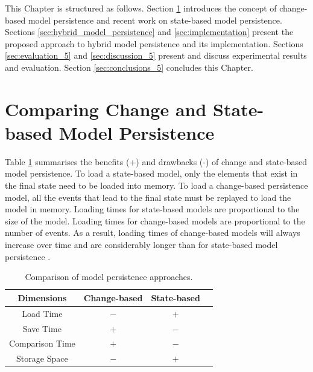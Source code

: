 This Chapter is structured as follows. Section \ref{sec:change_and_state_based_model_persistence} introduces the concept of change-based model persistence and recent work on state-based model persistence. Sections \ref{sec:hybrid_model_persistence} and \ref{sec:implementation} present the proposed approach to hybrid model persistence and its implementation. Sections \ref{sec:evaluation_5} and \ref{sec:discussion_5} present and discuss experimental results and evaluation. Section \ref{sec:conclusions_5} concludes this Chapter.

\section{Comparing Change and State-based Model Persistence}
\label{sec:change_and_state_based_model_persistence}
Table \ref{table:persistence_comparsion} summarises the benefits (+) and drawbacks (-) of change and state-based model persistence. To load a state-based model, only the elements that exist in the final state need to be loaded into memory. To load a change-based persistence model, all the events that lead to the final state must be replayed to load the model in memory. Loading times for state-based models are proportional to the size of the model. Loading times for change-based models are proportional to the number of events. As a result, loading times of change-based models will always increase over time and are considerably longer than for state-based model persistence \cite{yohannis2018towards,mens2002state}. 

\begin{table}[ht]
  \caption{Comparison of model persistence approaches.}
  \label{table:persistence_comparsion}
  \centering
  \begin{small}
    \begin{tabular}{ c c c c }
      \hline 
      \textbf{Dimensions} & \textbf{Change-based} & \textbf{State-based} \\
      \hline 
      Load Time & $-$ & $+$ \\
      Save Time & $+$ & $-$ \\
      Comparison Time & $+$ & $-$ \\
      Storage Space & $-$ & $+$ \\
      \hline 
    \end{tabular}
  \end{small}
\end{table}


